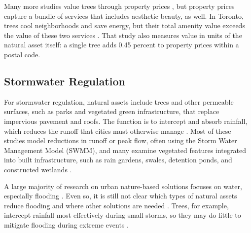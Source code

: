 \documentclass[12pt]{article}
\begin{document}
Many more studies value trees through property prices \citep{sanderValueUrbanTree2010, netusilEstimatingDemandTree2010}, but property prices capture a bundle of services that includes aesthetic beauty, as well. In Toronto, trees cool neighborhoods and save energy, but their total amenity value exceeds the value of these two services \citep{hanCoolCitiesValue2024}. That study also measures value in units of the natural asset itself: a single tree adds 0.45 percent to property prices within a postal code.

\subsection{Stormwater Regulation}\label{sec:stormwater}

For stormwater regulation, natural assets include trees and other permeable surfaces, such as parks and vegetated green infrastructure, that replace impervious pavement and roofs. The function is to intercept and absorb rainfall, which reduces the runoff that cities must otherwise manage \citep{veerkampReviewStudiesAssessing2021, herisPilotingUrbanEcosystem2021}. Most of these studies model reductions in runoff or peak flow, often using the Storm Water Management Model (SWMM), and many examine vegetated features integrated into built infrastructure, such as rain gardens, swales, detention ponds, and constructed wetlands \citep{veerkampReviewStudiesAssessing2021}. 

A large majority of research on urban nature-based solutions focuses on water, especially flooding \citep{mcphearsonGlobalSynthesisRegional2025}. Even so, it is still not clear which types of natural assets reduce flooding and where other solutions are needed \citep{diepEmpoweringCitiesGlobally2025}. Trees, for example, intercept rainfall most effectively during small storms, so they may do little to mitigate flooding during extreme events \citep{herisPilotingUrbanEcosystem2021}.
\end{document}
